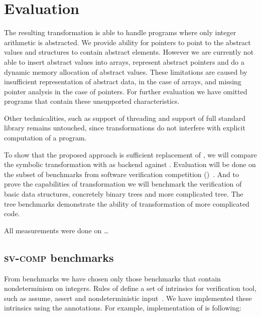 \chapter{Evaluation}\label{ch:results}

The resulting transformation is able to handle programs where only integer
arithmetic is abstracted. We provide ability for pointers to point to the
abstract values and structures to contain abstract elements. However we are
currently not able to insert abstract values into arrays, represent abstract
pointers and do a dynamic memory allocation of abstract values. These
limitations are caused by insufficient representation of abstract data, in the
case of arrays, and missing pointer analysis in the case of pointers. For
further evaluation we have omitted programs that contain these unsupported
characteristics.

Other technicalities, such as support of threading and support of full \Cpp{}
standard library remains untouched, since transformations do not interfere with
explicit computation of a program.

To show that the proposed approach is sufficient replacement of \SymDIVINE, we
will compare the symbolic transformation with \DIVINE as backend against
\SymDIVINE. Evaluation will be done on the subset of benchmarks from software
verification competition (\svcomp)~\cite{Beyer17}.
And to prove the capabilities of transformation we will benchmark the
verification of basic data structures, concretely binary trees and more
complicated \AVL tree. The \AVL tree benchmarks demonstrate the ability of
transformation of more complicated code.

All measurements were done on \dots
{}

\section{\textsc{sv-comp} benchmarks}

From \svcomp benchmarks we have chosen only those benchmarks that contain
nondeterminism on integers. Rules of \svcomp define a set of intrinsics for
verification tool, such as assume, assert and nondeterministic
input~\cite{svcomp}. We have implemented these intrinsics using the annotations.
For example, implementation of  is following:

